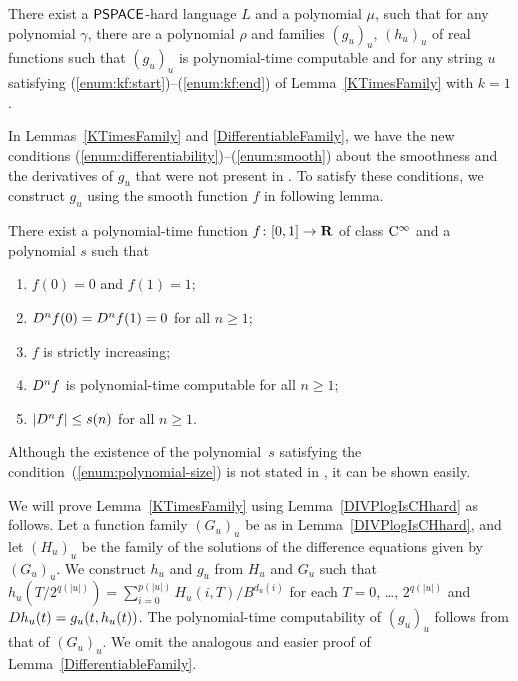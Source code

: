 \begin{lemma}
 \label{DifferentiableFamily}
 There exist a $\mathsf{PSPACE}$-hard language $L$ and a polynomial $\mu$,
 such that for any polynomial $\gamma$,
 there are a polynomial $\rho$ and families $(g_u)_u$, $(h_u)_u$ of real functions
 such that $(g_u)_u$ is polynomial-time computable and for any string $u$
 satisfying (\ref{enum:kf:start})--(\ref{enum:kf:end}) of Lemma~\ref{KTimesFamily} with $k = 1$.
\end{lemma}


In Lemmas~\ref{KTimesFamily} and \ref{DifferentiableFamily}, 
we have the new conditions (\ref{enum:differentiability})--(\ref{enum:smooth})
about the smoothness and the derivatives of $g_u$ 
that were not present in \cite[Lemma 4.1]{kawamura2010lipschitz}.
To satisfy these conditions,
we construct $g_u$ using the smooth function $f$ in following lemma.

\begin{lemma}
 \label{SmoothFunction}
 There exist a polynomial-time function $f \colon [0, 1] \to \mathbf R$ of class $\mathrm C^\infty$ and a polynomial $s$ such that
  \begin{enumerate}
   \item $f(0) = 0$ and $f(1) = 1$;
   \item $D ^n f (0) = D ^n f (1) = 0$ for all $n \ge 1$;
   \item $f$ is strictly increasing;
   \item $D ^n f$ is polynomial-time computable for all $n \ge 1$;
   \item \label{enum:polynomial-size}
	 $|D^n f| \le s(n)$ for all $n \ge 1$. 
  \end{enumerate}
 \end{lemma}

Although the existence of the polynomial~$s$ satisfying the condition~(\ref{enum:polynomial-size}) is not stated in \cite[Lemma 3.6]{ko1991complexity},
it can be shown easily.

We will prove Lemma~\ref{KTimesFamily} using Lemma~\ref{DIVPlogIsCHhard} as follows.
Let a function family $(G_u)_u$ be as in Lemma~\ref{DIVPlogIsCHhard},
and let $(H_u)_u$ be the family of the solutions of the difference equations given by $(G_u)_u$.
We construct $h_u$ and $g_u$ from $H_u$ and $G_u$ 
such that $h_u(T/2^{q(|u|)}) = \sum^{p(|u|)}_{i = 0} H_u(i, T)/B^{d_u(i)}$ for each $T = 0$, \ldots, $2^{q(|u|)}$
and $D h_u(t) = g_u(t, h_u(t))$.
The polynomial-time computability of $(g_u)_u$ follows from that of $(G_u)_u$.
We omit the analogous and easier proof of Lemma~\ref{DifferentiableFamily}.

